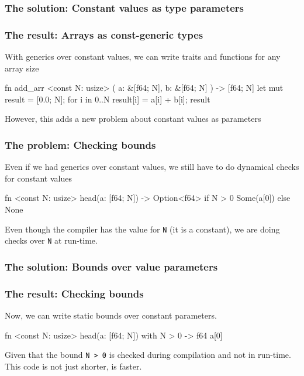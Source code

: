 \documentclass{beamer}
\begin{document}
\begin{frame}[fragile]
    \frametitle{The solution: Constant values as type parameters}
\end{frame}

\begin{frame}[fragile]
    \frametitle{The result: Arrays as const-generic types}
    With generics over constant values, we can write traits and functions for any array size
    \begin{rustcode}
    fn add_arr <const N: usize> (
        a: &[f64; N],
        b: &[f64; N]
    ) -> [f64; N] {
            let mut result = [0.0; N];
        for i in 0..N {
            result[i] = a[i] + b[i];
        }
        result
    }
    \end{rustcode}
    However, this adds a new problem about constant values as parameters
\end{frame}

\begin{frame}[fragile]
    \frametitle{The problem: Checking bounds}
    Even if we had generics over constant values, we still have to do dynamical checks for constant values 
    \begin{rustcode}
        fn <const N: usize> head(a: [f64; N]) -> Option<f64> {
            if N > 0 {
                Some(a[0])
            } else {
                None
            }
        }
    \end{rustcode}
    Even though the compiler has the value for  \texttt{N} (it is a constant), we are doing checks over \texttt{N} at run-time.
\end{frame}

\begin{frame}[fragile]
    \frametitle{The solution: Bounds over value parameters}

\end{frame}

\begin{frame}[fragile]
    \frametitle{The result: Checking bounds}
    Now, we can write static bounds over constant parameters.
    \begin{rustcode}
        fn <const N: usize> head(a: [f64; N]) with {N > 0} -> f64 {
            a[0]
        }
    \end{rustcode}
    Given that the bound \texttt{\footnotesize N > 0} is checked during compilation and not in run-time. This code is not just shorter, is faster.
\end{frame}
\end{document}
